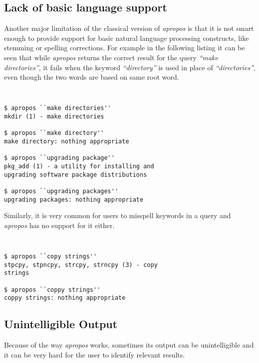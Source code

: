 \documentclass[letterpaper,twocolumn,10pt]{article}
\begin{document}
\subsection{Lack of basic language support}
Another major limitation of the classical version of \textit{apropos} is that
it is not smart enough to provide support for basic natural language processing
constructs,
like stemming or spelling corrections.
For example in the following listing it can be seen
that while \textit{apropos} returns the correct result for the query
\textit{``make directories''}, it fails when the keyword \textit{``directory''}
is used in place of \textit{``directories''}, even though the two words are based
on same root word. \\

{\tt \small
{}
\begin{lstlisting}
$ apropos ``make directories''
mkdir (1) - make directories

$ apropos ``make directory''
make directory: nothing appropriate

$ apropos ``upgrading package''
pkg_add (1) - a utility for installing and
upgrading software package distributions

$ apropos ``upgrading packages''
upgrading packages: nothing appropriate
\end{lstlisting}
}

Similarly, it is very common for users to misspell keywords in a query and \textit{apropos} has no support for it either.

{\tt \small
{}
\begin{lstlisting}
$ apropos ``copy strings''
stpcpy, stpncpy, strcpy, strncpy (3) - copy
strings

$ apropos ``coppy strings''
coppy strings: nothing appropriate
\end{lstlisting}
}

\subsection{Unintelligible Output}
Because of the way \textit{apropos} works, sometimes its output can be
unintelligible and it can be very hard for the user to identify relevant results. \\
\end{document}
